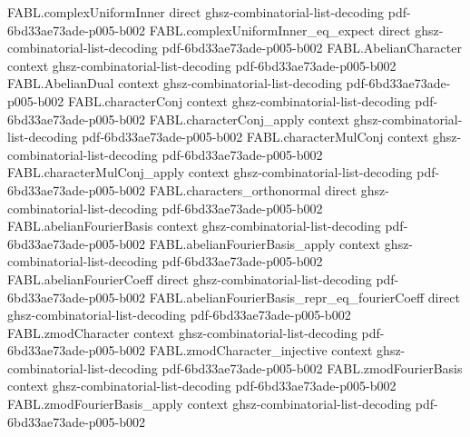 \begin{theorem}
\label{FABL.abelian_fourier_expansion}
\leanok
{}
\proofstep
  {FABL.complexUniformInner}
  {direct}
  {ghsz-combinatorial-list-decoding}
  {pdf-6bd33ae73ade-p005-b002}
\proofstep
  {FABL.complexUniformInner_eq_expect}
  {direct}
  {ghsz-combinatorial-list-decoding}
  {pdf-6bd33ae73ade-p005-b002}
\proofstep
  {FABL.AbelianCharacter}
  {context}
  {ghsz-combinatorial-list-decoding}
  {pdf-6bd33ae73ade-p005-b002}
\proofstep
  {FABL.AbelianDual}
  {context}
  {ghsz-combinatorial-list-decoding}
  {pdf-6bd33ae73ade-p005-b002}
\proofstep
  {FABL.characterConj}
  {context}
  {ghsz-combinatorial-list-decoding}
  {pdf-6bd33ae73ade-p005-b002}
\proofstep
  {FABL.characterConj_apply}
  {context}
  {ghsz-combinatorial-list-decoding}
  {pdf-6bd33ae73ade-p005-b002}
\proofstep
  {FABL.characterMulConj}
  {context}
  {ghsz-combinatorial-list-decoding}
  {pdf-6bd33ae73ade-p005-b002}
\proofstep
  {FABL.characterMulConj_apply}
  {context}
  {ghsz-combinatorial-list-decoding}
  {pdf-6bd33ae73ade-p005-b002}
\proofstep
  {FABL.characters_orthonormal}
  {direct}
  {ghsz-combinatorial-list-decoding}
  {pdf-6bd33ae73ade-p005-b002}
\proofstep
  {FABL.abelianFourierBasis}
  {context}
  {ghsz-combinatorial-list-decoding}
  {pdf-6bd33ae73ade-p005-b002}
\proofstep
  {FABL.abelianFourierBasis_apply}
  {context}
  {ghsz-combinatorial-list-decoding}
  {pdf-6bd33ae73ade-p005-b002}
\proofstep
  {FABL.abelianFourierCoeff}
  {direct}
  {ghsz-combinatorial-list-decoding}
  {pdf-6bd33ae73ade-p005-b002}
\proofstep
  {FABL.abelianFourierBasis_repr_eq_fourierCoeff}
  {direct}
  {ghsz-combinatorial-list-decoding}
  {pdf-6bd33ae73ade-p005-b002}
\proofstep
  {FABL.zmodCharacter}
  {context}
  {ghsz-combinatorial-list-decoding}
  {pdf-6bd33ae73ade-p005-b002}
\proofstep
  {FABL.zmodCharacter_injective}
  {context}
  {ghsz-combinatorial-list-decoding}
  {pdf-6bd33ae73ade-p005-b002}
\proofstep
  {FABL.zmodFourierBasis}
  {context}
  {ghsz-combinatorial-list-decoding}
  {pdf-6bd33ae73ade-p005-b002}
\proofstep
  {FABL.zmodFourierBasis_apply}
  {context}
  {ghsz-combinatorial-list-decoding}
  {pdf-6bd33ae73ade-p005-b002}
\proofstep

\end{theorem}
